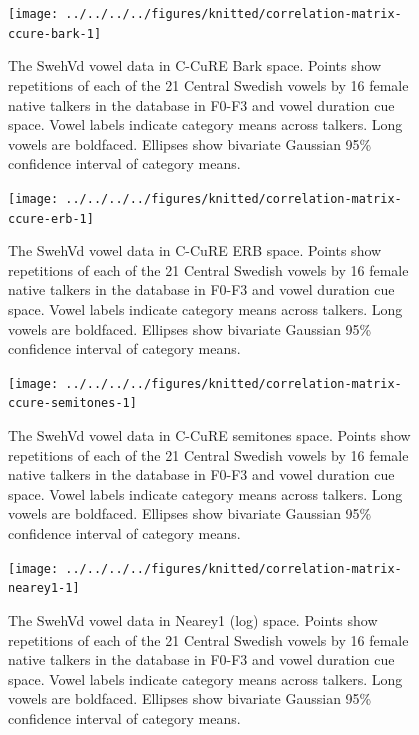 \documentclass[utf8]{frontiers_suppmat} %
\begin{document}
\begin{figure}[H]
\texttt{[image: ../../../../figures/knitted/correlation-matrix-ccure-bark-1]} \caption{The SwehVd vowel data in C-CuRE Bark space. Points show repetitions of each of the 21 Central Swedish vowels by 16 female native talkers in the database in F0-F3 and vowel duration cue space. Vowel labels indicate category means across talkers. Long vowels are boldfaced. Ellipses show bivariate Gaussian 95\% confidence interval of category means.}\label{fig:correlation-matrix-ccure-bark}
\end{figure}



\begin{figure}[H]
\texttt{[image: ../../../../figures/knitted/correlation-matrix-ccure-erb-1]} \caption{The SwehVd vowel data in C-CuRE ERB space. Points show repetitions of each of the 21 Central Swedish vowels by 16 female native talkers in the database in F0-F3 and vowel duration cue space. Vowel labels indicate category means across talkers. Long vowels are boldfaced. Ellipses show bivariate Gaussian 95\% confidence interval of category means.}\label{fig:correlation-matrix-ccure-erb}
\end{figure}



\begin{figure}[H]
\texttt{[image: ../../../../figures/knitted/correlation-matrix-ccure-semitones-1]} \caption{The SwehVd vowel data in C-CuRE semitones space. Points show repetitions of each of the 21 Central Swedish vowels by 16 female native talkers in the database in F0-F3 and vowel duration cue space. Vowel labels indicate category means across talkers. Long vowels are boldfaced. Ellipses show bivariate Gaussian 95\% confidence interval of category means.}\label{fig:correlation-matrix-ccure-semitones}
\end{figure}



\begin{figure}[H]
\texttt{[image: ../../../../figures/knitted/correlation-matrix-nearey1-1]} \caption{The SwehVd vowel data in Nearey1 (log) space. Points show repetitions of each of the 21 Central Swedish vowels by 16 female native talkers in the database in F0-F3 and vowel duration cue space. Vowel labels indicate category means across talkers. Long vowels are boldfaced. Ellipses show bivariate Gaussian 95\% confidence interval of category means.}\label{fig:correlation-matrix-nearey1}
\end{figure}
\end{document}
